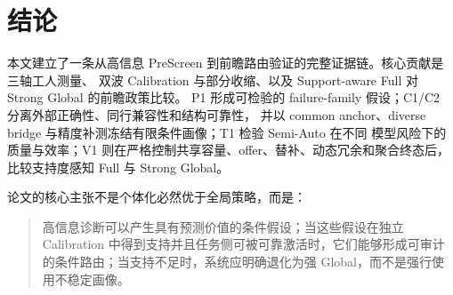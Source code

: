 \section{结论}

本文建立了一条从高信息 PreScreen 到前瞻路由验证的完整证据链。核心贡献是三轴工人测量、
双波 Calibration 与部分收缩、以及 Support-aware Full 对 Strong Global 的前瞻政策比较。
P1 形成可检验的 failure-family 假设；C1/C2 分离外部正确性、同行兼容性和结构可靠性，
并以 common anchor、diverse bridge 与精度补测冻结有限条件画像；T1 检验 Semi-Auto 在不同
模型风险下的质量与效率；V1 则在严格控制共享容量、offer、替补、动态冗余和聚合终态后，
比较支持度感知 Full 与 Strong Global。

论文的核心主张不是个体化必然优于全局策略，而是：

\begin{quote}
高信息诊断可以产生具有预测价值的条件假设；当这些假设在独立 Calibration 中得到支持并且任务侧可被可靠激活时，它们能够形成可审计的条件路由；当支持不足时，系统应明确退化为强 Global，而不是强行使用不稳定画像。
\end{quote}
